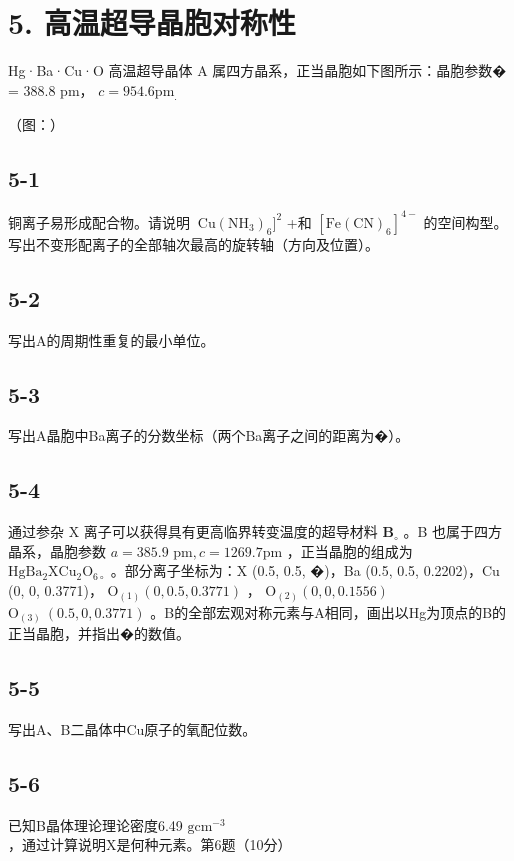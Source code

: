 \section*{5. 高温超导晶胞对称性}
Hg·Ba·Cu·O ⾼温超导晶体 A 属四⽅晶系，正当晶胞如下图所⽰：晶胞参数� = 388.8 pm， $c = 9 5 4 . 6 \mathrm { p m } _ { \cdot }$

（图：）

\subsection*{5-1}
铜离⼦易形成配合物。请说明 $\mathrm { \ C u ( N H _ { 3 } ) _ { 6 } ] ^ { 2 } }$ +和 $\mathrm { [ F e ( C N ) _ { 6 } ] ^ { 4 - } }$ 的空间构型。写出不变形配离⼦的全部轴次最⾼的旋转轴（⽅向及位置）。

\subsection*{5-2}
写出A的周期性重复的最⼩单位。

\subsection*{5-3}
写出A晶胞中Ba离⼦的分数坐标（两个Ba离⼦之间的距离为�）。

\subsection*{5-4}
通过参杂 X 离⼦可以获得具有更⾼临界转变温度的超导材料 $\mathbf { B } _ { \circ }$ 。B 也属于四⽅晶系，晶胞参数 $a = 3 8 5 . 9$ $\mathrm { p m } , c = 1 2 6 9 . 7 \mathrm { p m }$ ，正当晶胞的组成为 $\mathrm { H g B a _ { 2 } X C u _ { 2 } O _ { 6 \circ } }$ 。部分离⼦坐标为：X (0.5, 0.5, �)，Ba (0.5, 0.5, 0.2202)，Cu (0, 0, 0.3771)， $\mathrm { O _ { ( 1 ) } } \left( 0 , 0 . 5 , 0 . 3 7 7 1 \right)$ ， $\mathrm { O _ { ( 2 ) } } \left( 0 , 0 , 0 . 1 5 5 6 \right)$ $\mathrm { O } _ { ( 3 ) } \ ( 0 . 5 , 0 , 0 . 3 7 7 1 )$ 。B的全部宏观对称元素与A相同，画出以Hg为顶点的B的正当晶胞，并指出�的数值。

\subsection*{5-5}
写出A、B⼆晶体中Cu原⼦的氧配位数。

\subsection*{5-6}
已知B晶体理论理论密度6.49 $\mathrm { g c m } ^ { - 3 }$ ，通过计算说明X是何种元素。第6题（10分）

